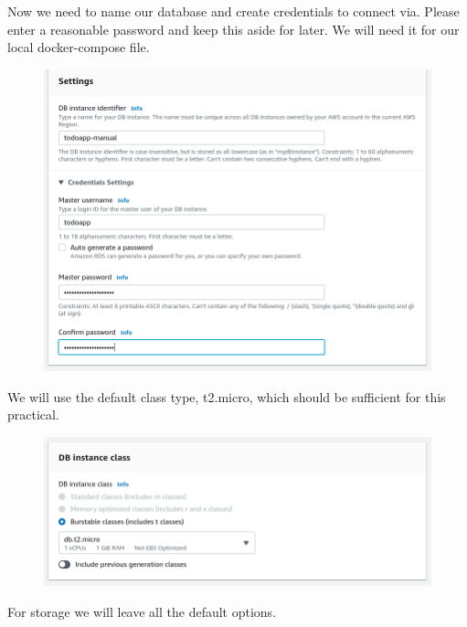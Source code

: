 \documentclass{csse4400}
\begin{document}
Now we need to name our database and create credentials to connect via.
Please enter a reasonable password and keep this aside for later.
We will need it for our local docker-compose file.

\begin{figure}[H]
  \includegraphics[width=\textwidth]{images/db3}
\end{figure}

We will use the default class type, t2.micro, which should be sufficient for this practical.


\begin{figure}[H]
  \includegraphics[width=\textwidth]{images/db4}
\end{figure}

For storage we will leave all the default options.
\end{document}
